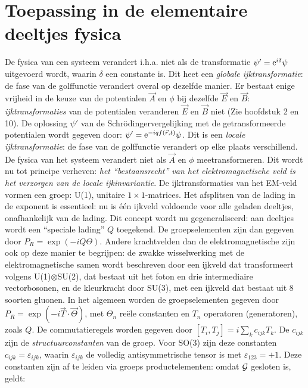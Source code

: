 \documentclass[twoside]{report}
\begin{document}
\section{Toepassing in de elementaire deeltjes fysica}
De fysica van een systeem verandert i.h.a. niet als de transformatie
$\psi'={\rm e}^{i\delta}\psi$ uitgevoerd wordt, waarin $\delta$ een constante
is. Dit heet een {\it globale ijktransformatie}: de fase van de golffunctie
verandert overal op dezelfde manier.
\npar
Er bestaat enige vrijheid in de keuze van de potentialen $\vec{A}$ en $\phi$
bij dezelfde $\vec{E}$ en $\vec{B}$: {\it ijktransformaties} van de
potentialen veranderen $\vec{E}$ en $\vec{B}$ niet (Zie hoofdstuk 2 en 10).
De oplossing $\psi'$ van de\linebreak
Schr\"odingervergelijking met de getransformeerde potentialen wordt gegeven
door: $\psi'={\rm e}^{-iqf(\vec{r},t)}\psi$.
\npar
Dit is een {\it locale ijktransformatie}: de fase van de golffunctie
verandert op elke plaats verschillend. De fysica van het systeem verandert
niet als $\vec{A}$ en $\phi$ meetransformeren. Dit wordt nu tot principe
verheven: {\it het ``bestaansrecht'' van het elektromagnetische veld is het
verzorgen van de locale ijkinvariantie}.
\npar
De ijktransformaties van het EM-veld vormen een groep: U(1), unitaire
$1\times1$-matrices. Het afsplitsen van de lading in de exponent is
essentieel: nu is \'e\'en ijkveld voldoende voor alle geladen deeltjes,
onafhankelijk van de lading.
\npar
Dit concept wordt nu gegeneraliseerd: aan deeltjes wordt een ``speciale
lading'' $Q$ toegekend. De groepselementen zijn dan gegeven door
$P_R=\exp(-iQ\Theta)$.
\npar
Andere krachtvelden dan de elektromagnetische zijn ook op deze manier te
begrijpen: de zwakke wisselwerking met de elektromagnetische samen wordt
beschreven door een ijkveld dat transformeert volgens U(1)$\otimes$SU(2), dat
bestaat uit het foton en drie intermediaire vectorbosonen, en de kleurkracht
door SU(3), met een ijkveld dat bestaat uit 8 soorten gluonen.
\npar
In het algemeen worden de groepselementen gegeven door
$P_R=\exp(-i\vec{T}\cdot\vec{\Theta})$, met $\Theta_n$ re\"ele constanten en
$T_n$ operatoren (generatoren), zoals $Q$. De commutatieregels worden gegeven
door $[T_i,T_j]=i\sum\limits_kc_{ijk}T_k$. De $c_{ijk}$ zijn de
{\it structuurconstanten} van de groep. Voor SO(3) zijn deze constanten
$c_{ijk}=\varepsilon_{ijk}$, waarin $\varepsilon_{ijk}$ de volledig
antisymmetrische tensor is met $\varepsilon_{123}=+1$.
\npar
Deze constanten zijn af te leiden via groeps productelementen: omdat ${\cal{G}}$
gesloten is, geldt:\\
\end{document}
